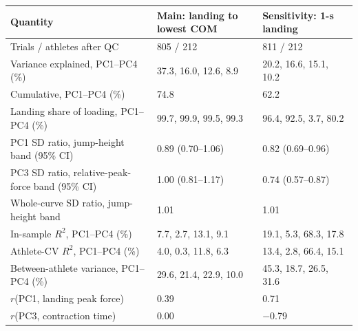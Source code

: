 \begin{tabular}{lll}
\toprule
Quantity & Main: landing to lowest COM & Sensitivity: 1-s landing \\
\midrule
Trials / athletes after QC & 805 / 212 & 811 / 212 \\
Variance explained, PC1--PC4 (\%) & 37.3, 16.0, 12.6, 8.9 & 20.2, 16.6, 15.1, 10.2 \\
Cumulative, PC1--PC4 (\%) & 74.8 & 62.2 \\
Landing share of loading, PC1--PC4 (\%) & 99.7, 99.9, 99.5, 99.3 & 96.4, 92.5, 3.7, 80.2 \\
PC1 SD ratio, jump-height band (95\% CI) & 0.89 (0.70--1.06) & 0.82 (0.69--0.96) \\
PC3 SD ratio, relative-peak-force band (95\% CI) & 1.00 (0.81--1.17) & 0.74 (0.57--0.87) \\
Whole-curve SD ratio, jump-height band & 1.01 & 1.01 \\
In-sample $R^2$, PC1--PC4 (\%) & 7.7, 2.7, 13.1, 9.1 & 19.1, 5.3, 68.3, 17.8 \\
Athlete-CV $R^2$, PC1--PC4 (\%) & 4.0, 0.3, 11.8, 6.3 & 13.4, 2.8, 66.4, 15.1 \\
Between-athlete variance, PC1--PC4 (\%) & 29.6, 21.4, 22.9, 10.0 & 45.3, 18.7, 26.5, 31.6 \\
$r$(PC1, landing peak force) & 0.39 & 0.71 \\
$r$(PC3, contraction time) & 0.00 & $-$0.79 \\
\bottomrule
\end{tabular}
